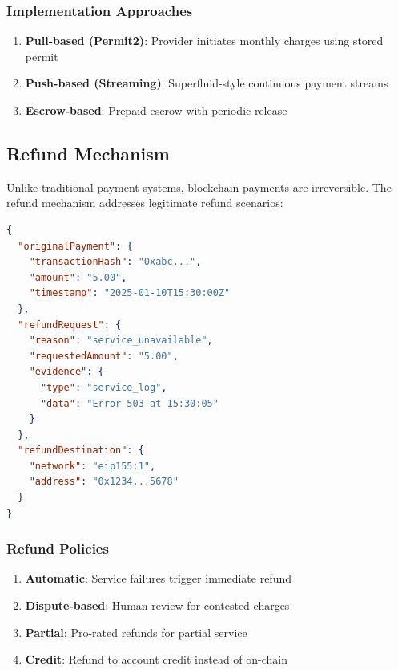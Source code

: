 \subsubsection{Implementation Approaches}

\begin{enumerate}
    \item \textbf{Pull-based (Permit2)}: Provider initiates monthly charges using stored permit
    \item \textbf{Push-based (Streaming)}: Superfluid-style continuous payment streams
    \item \textbf{Escrow-based}: Prepaid escrow with periodic release
\end{enumerate}

\subsection{Refund Mechanism}
\label{subsec:refunds}

Unlike traditional payment systems, blockchain payments are irreversible. The refund mechanism addresses legitimate refund scenarios:

\begin{lstlisting}[language=json, caption={Refund Request Schema}]
{
  "originalPayment": {
    "transactionHash": "0xabc...",
    "amount": "5.00",
    "timestamp": "2025-01-10T15:30:00Z"
  },
  "refundRequest": {
    "reason": "service_unavailable",
    "requestedAmount": "5.00",
    "evidence": {
      "type": "service_log",
      "data": "Error 503 at 15:30:05"
    }
  },
  "refundDestination": {
    "network": "eip155:1",
    "address": "0x1234...5678"
  }
}
\end{lstlisting}

\subsubsection{Refund Policies}

\begin{enumerate}
    \item \textbf{Automatic}: Service failures trigger immediate refund
    \item \textbf{Dispute-based}: Human review for contested charges
    \item \textbf{Partial}: Pro-rated refunds for partial service
    \item \textbf{Credit}: Refund to account credit instead of on-chain
\end{enumerate}

